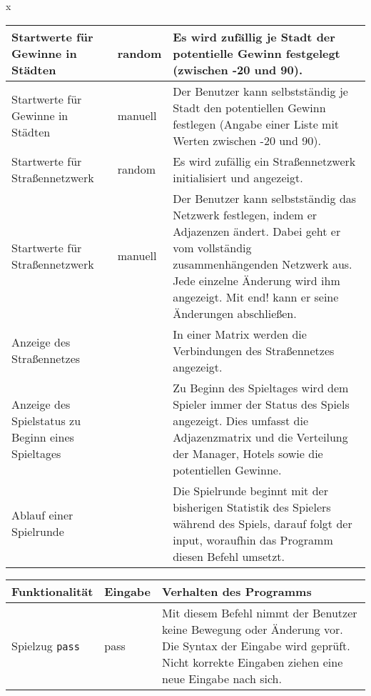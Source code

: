 \documentclass[a4paper]{article}
\begin{document}
\begin{exercise}{x}
\begin{center}
\begin{tabular}{| p{2.5cm} | p{2.2cm} | p{10cm} |}
		Startwerte f\"ur Gewinne in St\"adten & random
		& Es wird zuf\"allig je Stadt der potentielle Gewinn festgelegt (zwischen -20 und 90). \\ \hline
		
		Startwerte f\"ur Gewinne in St\"adten & manuell
		& Der Benutzer kann selbstst\"andig je Stadt den potentiellen Gewinn festlegen (Angabe
		einer Liste mit Werten zwischen -20 und 90). \\ \hline
		
		Startwerte f\"ur Stra\ss{}ennetzwerk & random
		& Es wird zuf\"allig ein Stra\ss{}ennetzwerk initialisiert und angezeigt. \\ \hline
		
		Startwerte f\"ur Stra\ss{}ennetzwerk & manuell
		& Der Benutzer kann selbstst\"andig das Netzwerk festlegen, indem er Adjazenzen \"andert.
		Dabei geht er vom vollst\"andig zusammenh\"angenden Netzwerk aus. Jede einzelne 
		\"Anderung wird ihm angezeigt. Mit end! kann er seine \"Anderungen abschlie\ss{}en. \\ \hline
		
		Anzeige des Stra\ss{}ennetzes &
		& In einer Matrix werden die Verbindungen des Stra\ss{}ennetzes angezeigt. \\ \hline
		
		Anzeige des Spielstatus zu Beginn eines Spieltages &
		& Zu Beginn des Spieltages wird dem Spieler immer der Status des Spiels angezeigt.
		Dies umfasst die Adjazenzmatrix und die Verteilung der Manager, Hotels sowie die
		potentiellen Gewinne. \\ \hline
		
		Ablauf einer Spielrunde &
		& Die Spielrunde beginnt mit der bisherigen Statistik des Spielers w\"ahrend des Spiels,
		darauf folgt der input, woraufhin das Programm diesen Befehl umsetzt. \\ \hline
		
	\end{tabular}

	\begin{tabular}{| p{2.5cm} | p{2.2cm} | p{10cm} |}
		\hline
		Funktionalit\"at & Eingabe & Verhalten des Programms\\ \hline \hline
		
		Spielzug \texttt{pass} & pass
		& Mit diesem Befehl nimmt der Benutzer keine Bewegung oder \"Anderung vor.
		Die Syntax der Eingabe wird gepr\"uft. Nicht korrekte Eingaben ziehen eine neue Eingabe
		nach sich. \\ \hline
		

\end{tabular}
\end{center}
\end{exercise}
\end{document}
